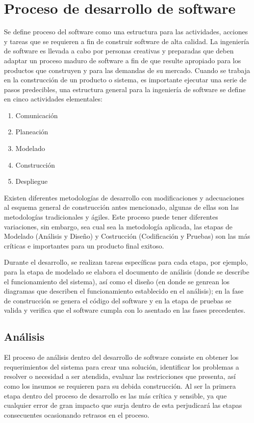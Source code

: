 \section{Proceso de desarrollo de software}

Se define proceso del software como una estructura para las actividades, acciones y tareas que se requieren a fin de construir software de alta calidad. La ingeniería de software es llevada a cabo por personas creativas y preparadas que deben adaptar un proceso maduro de software a fin de que resulte apropiado para los productos que construyen y para las demandas de su mercado.
Cuando se trabaja en la construcción de un producto o sistema, es importante ejecutar una serie de pasos predecibles, una estructura general para la ingeniería de software se define en cinco actividades elementales:

\begin{enumerate}
	\item Comunicación
	\item Planeación
	\item Modelado
	\item Construcción
	\item Despliegue
\end{enumerate}

Existen diferentes metodologías de desarrollo con modificaciones y adecuaciones al esquema general de construcción antes mencionado, algunas de ellas son las metodologías tradicionales y ágiles. Este proceso puede tener diferentes variaciones, sin embargo, sea cual sea la metodología aplicada, las etapas de Modelado (Análisis y Diseño) y Costrucción (Codificación y Pruebas) son las más críticas e importantes para un producto final exitoso.

Durante el desarrollo, se realizan tareas específicas para cada etapa, por ejemplo, para la etapa de modelado se elabora el documento de análisis (donde se describe el funcionamiento del sistema), así como el diseño (en donde se genrean los diagramas que describen el funcionamiento establecido en el análisis); en la fase de construcción se genera el código del software y en la etapa de pruebas se valida y verifica que el software cumpla con lo asentado en las fases precedentes.

\subsection{Análisis}

El proceso de análisis dentro del desarrollo de software consiste en obtener los requerimientos del sistema para crear una solución, identificar los problemas a resolver o necesidad a ser atendida, evaluar las restricciones que presenta, así como los insumos se requieren para su debida construcción.
Al ser la primera etapa dentro del proceso de desarrollo es las más crítica y sensible, ya que cualquier error de gran impacto que surja dentro de esta perjudicará las etapas consecuentes ocasionando retrasos en el proceso.

